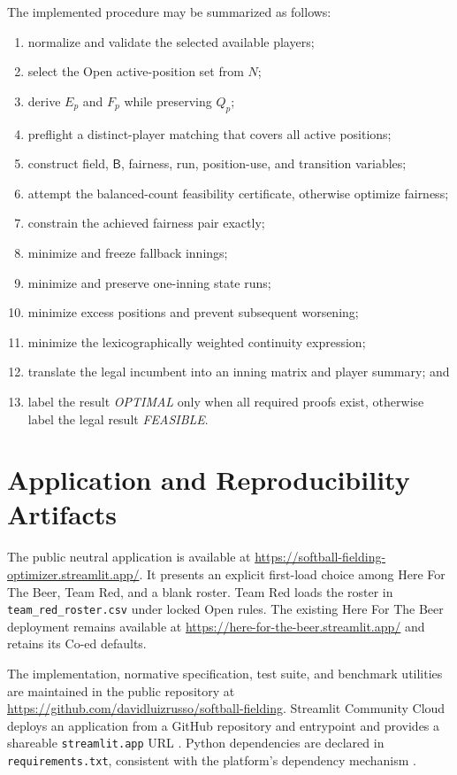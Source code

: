 \documentclass[11pt]{article}
\newcommand{\code}[1]{\texttt{#1}}
\newcommand{\Bench}{\mathsf{B}}
\begin{document}
The implemented procedure may be summarized as follows:
\begin{enumerate}
    \item normalize and validate the selected available players;
    \item select the Open active-position set from $N$;
    \item derive $E_p$ and $F_p$ while preserving $Q_p$;
    \item preflight a distinct-player matching that covers all active positions;
    \item construct field, $\Bench$, fairness, run, position-use, and transition
    variables;
    \item attempt the balanced-count feasibility certificate, otherwise optimize
    fairness;
    \item constrain the achieved fairness pair exactly;
    \item minimize and freeze fallback innings;
    \item minimize and preserve one-inning state runs;
    \item minimize excess positions and prevent subsequent worsening;
    \item minimize the lexicographically weighted continuity expression;
    \item translate the legal incumbent into an inning matrix and player
    summary; and
    \item label the result \emph{OPTIMAL} only when all required proofs exist,
    otherwise label the legal result \emph{FEASIBLE}.
\end{enumerate}

\section{Application and Reproducibility Artifacts}

The public neutral application is available at
\url{https://softball-fielding-optimizer.streamlit.app/}. It presents an
explicit first-load choice among Here For The Beer, Team Red, and a blank
roster. Team Red loads the roster in \code{team\_red\_roster.csv} under locked
Open rules. The existing Here For The Beer deployment remains available at
\url{https://here-for-the-beer.streamlit.app/} and retains its Co-ed defaults.

The implementation, normative specification, test suite, and benchmark
utilities are maintained in the public repository at
\url{https://github.com/davidluizrusso/softball-fielding}. Streamlit Community
Cloud deploys an application from a GitHub repository and entrypoint and
provides a shareable \code{streamlit.app} URL \cite{streamlitdeploy}. Python
dependencies are declared in \code{requirements.txt}, consistent with the
platform's dependency mechanism \cite{streamlitdeps}.
\end{document}
